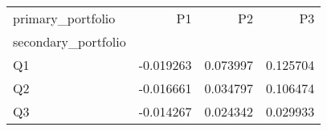 \begin{tabular}{lrrr}
\toprule
primary_portfolio & P1 & P2 & P3 \\
secondary_portfolio &  &  &  \\
\midrule
Q1 & -0.019263 & 0.073997 & 0.125704 \\
Q2 & -0.016661 & 0.034797 & 0.106474 \\
Q3 & -0.014267 & 0.024342 & 0.029933 \\
\bottomrule
\end{tabular}
